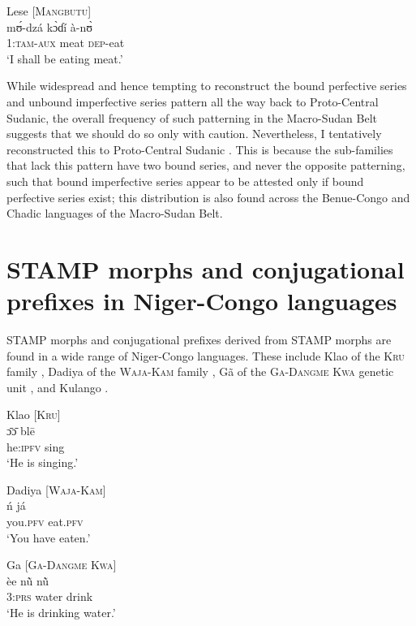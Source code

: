 \documentclass[output=paper]{langsci/langscibook}
\begin{document}
\ea\label{ex:anderson:65}
Lese \citep[51]{TuckerBryan1966}        \textsc{[Mangbutu]}\\
\gll m\'ʊ-dzá    k\`ɔɗí  à-n\`ʊ\\
1:\textsc{tam-aux}  meat  \textsc{dep}-eat\\
\glt `I shall be eating meat.'  
\z

While widespread and hence tempting to reconstruct the bound perfective series and unbound imperfective series pattern all the way back to Proto-Central Sudanic, the overall frequency of such patterning in the Macro-Sudan Belt suggests that we should do so only with caution. Nevertheless, I tentatively reconstructed this to Proto-Central Sudanic \citep{Anderson2015}. This is because the sub-families that lack this pattern have two bound series, and never the opposite patterning, such that bound imperfective series appear to be attested only if bound perfective series exist; this distribution is also found across the Benue-Congo and Chadic languages of the Macro-Sudan Belt.

\section{STAMP morphs and conjugational prefixes in Niger-Congo languages}\label{sec:Anderson:9}

STAMP morphs and conjugational prefixes derived from STAMP morphs are found in a wide range of Niger-Congo languages. These include Klao of the \textsc{Kru} family , Dadiya of the \textsc{Waja-Kam} family , Gã of the \textsc{Ga-Dangme Kwa} genetic unit , and Kulango .

\ea\label{ex:anderson:66}
Klao \citep[3, 18]{Marchese1982}            [\textsc{Kru}]\\
\gll \={ɔ}\={ɔ}    bl\={e}  \\
he\textsc{:ipfv}   sing\\
\glt `He is singing.'
\z

\ea\label{ex:anderson:67}
Dadiya   \citep[196]{Jungraithmayr1968}        [\textsc{Waja-Kam]}\\
\gll \'{n}    já   \\
you\textsc{.pfv}  eat.\textsc{pfv} \\
\glt `You have eaten.'
\z

\ea\label{ex:anderson:68}
Ga \citep[105]{Kropp1988}          \textsc{[Ga-Dangme Kwa]}  \\
\gll èe     n\`{\~u}  n\`{\~u}  \\
3\textsc{:prs}  water  drink\\
\glt `He is drinking water.'
\z
\end{document}
